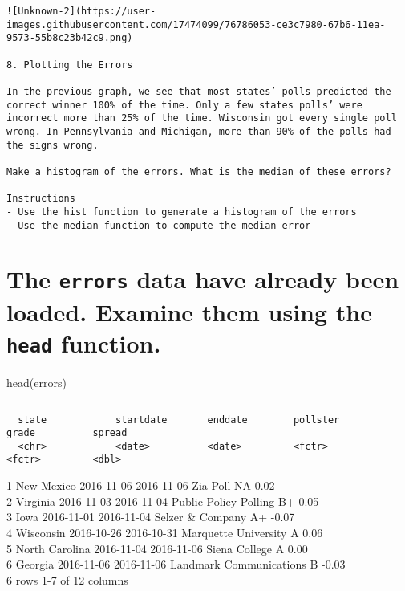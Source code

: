 \documentclass[
]{article}
\begin{document}
\begin{verbatim}
![Unknown-2](https://user-images.githubusercontent.com/17474099/76786053-ce3c7980-67b6-11ea-9573-55b8c23b42c9.png)

8. Plotting the Errors

In the previous graph, we see that most states’ polls predicted the correct winner 100% of the time. Only a few states polls’ were incorrect more than 25% of the time. Wisconsin got every single poll wrong. In Pennsylvania and Michigan, more than 90% of the polls had the signs wrong.

Make a histogram of the errors. What is the median of these errors?

Instructions
- Use the hist function to generate a histogram of the errors
- Use the median function to compute the median error
\end{verbatim}

\hypertarget{the-errors-data-have-already-been-loaded.-examine-them-using-the-head-function.}{%
\section{\texorpdfstring{The \texttt{errors} data have already been
loaded. Examine them using the \texttt{head}
function.}{The errors data have already been loaded. Examine them using the head function.}}\label{the-errors-data-have-already-been-loaded.-examine-them-using-the-head-function.}}

head(errors)

\begin{verbatim}
\end{verbatim}

\begin{verbatim}
  state            startdate       enddate        pollster                 grade          spread
  <chr>            <date>          <date>         <fctr>                   <fctr>         <dbl>
\end{verbatim}

1 New Mexico 2016-11-06 2016-11-06 Zia Poll NA 0.02\\
2 Virginia 2016-11-03 2016-11-04 Public Policy Polling B+ 0.05\\
3 Iowa 2016-11-01 2016-11-04 Selzer \& Company A+ -0.07\\
4 Wisconsin 2016-10-26 2016-10-31 Marquette University A 0.06\\
5 North Carolina 2016-11-04 2016-11-06 Siena College A 0.00\\
6 Georgia 2016-11-06 2016-11-06 Landmark Communications B -0.03\\
6 rows \textbar{} 1-7 of 12 columns
\end{document}
